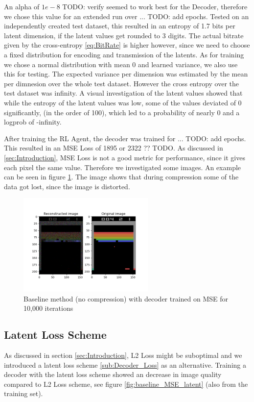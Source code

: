 An alpha of $1e-8$ TODO: verify seemed to work best for the Decoder, therefore
we chose this value for an extended run over ... TODO: add epochs. Tested on an
independently created test dataset, this resulted in an entropy of 1.7 bits per
latent dimension, if the latent values get rounded to 3 digits. The actual
bitrate given by the cross-entropy \ref{eq:BitRate} is higher however, since
we need to choose a fixed distribution for encoding and transmission of the
latents. As for training we chose a normal distribution with mean 0 and learned
variance, we also use this for testing. The expected variance per dimension was
estimated by the mean per dimnesion over the whole test dataset. However the
cross entropy over the test dataset was infinity. A visual investigation of the
latent values showed that while the entropy of the latent values was low, some
of the values deviated of 0 significantly, (in the order of 100), which led to a
probability of nearly 0 and a logprob of -infinity.

After training the RL Agent, the decoder was trained for ... TODO: add epochs.
This resulted in an MSE Loss of 1895 or 2322 ?? TODO. As discussed in
\ref{sec:Introduction}, MSE Loss is not a good metric for performance, since it
gives each pixel the same value. Therefore we investigated some images. An
example can be seen in figure \ref{fig:final_agent}. The image shows that during
compression some of the data got lost, since the image is distorted.
\begin{figure}[H]
    \centering
    \includegraphics[width=0.6\textwidth]{images/orig_reconstructed_final_agent.png}
    \caption{Baseline method (no compression) with decoder trained on MSE for 10,000 iterations}
    \label{fig:final_agent}
\end{figure}

\subsection{Latent Loss Scheme}
As discussed in section \ref{sec:Introduction}, L2 Loss might be suboptimal and
we introduced a latent loss scheme \ref{sub:Decoder_Loss} as an alternative.
Training a decoder with the latent loss scheme showed an decrease in image
quality compared to L2 Loss scheme, see figure \ref{fig:baseline_MSE_latent}
(also from the training set).

